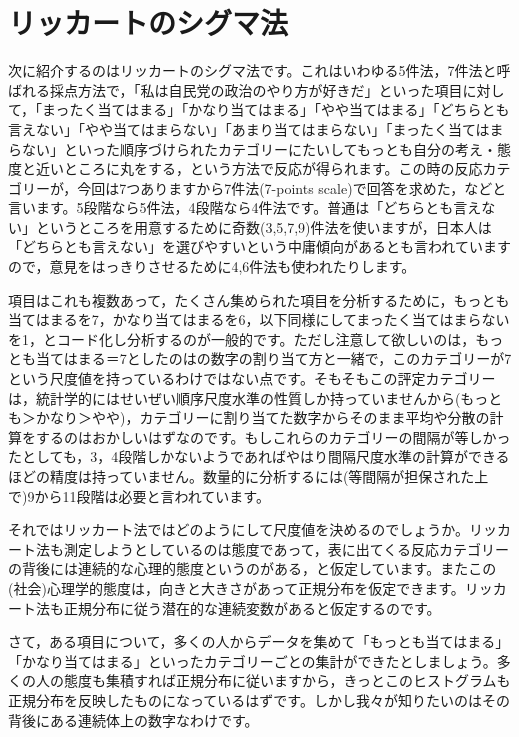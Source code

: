\documentclass{ltjsbook}
\begin{document}
\section{リッカートのシグマ法}
\label{LikertScale}
次に紹介するのはリッカートのシグマ法です。これはいわゆる5件法，7件法と呼ばれる採点方法で，「私は自民党の政治のやり方が好きだ」といった項目に対して，「まったく当てはまる」「かなり当てはまる」「やや当てはまる」「どちらとも言えない」「やや当てはまらない」「あまり当てはまらない」「まったく当てはまらない」といった順序づけられたカテゴリーにたいしてもっとも自分の考え・態度と近いところに丸をする，という方法で反応が得られます。この時の反応カテゴリーが，今回は7つありますから7件法(7-points scale)で回答を求めた，などと言います。5段階なら5件法，4段階なら4件法です。普通は「どちらとも言えない」というところを用意するために奇数(3,5,7,9)件法を使いますが，日本人は「どちらとも言えない」を選びやすいという中庸傾向があるとも言われていますので，意見をはっきりさせるために4,6件法も使われたりします。

項目はこれも複数あって，たくさん集められた項目を分析するために，もっとも当てはまるを7，かなり当てはまるを6，以下同様にしてまったく当てはまらないを1，とコード化し分析するのが一般的です。ただし注意して欲しいのは，もっとも当てはまる＝7としたのはの数字の割り当て方と一緒で，このカテゴリーが7という尺度値を持っているわけではない点です。そもそもこの評定カテゴリーは，統計学的にはせいぜい順序尺度水準の性質しか持っていませんから(もっとも＞かなり＞やや)，カテゴリーに割り当てた数字からそのまま平均や分散の計算をするのはおかしいはずなのです。もしこれらのカテゴリーの間隔が等しかったとしても，3，4段階しかないようであればやはり間隔尺度水準の計算ができるほどの精度は持っていません。数量的に分析するには(等間隔が担保された上で)9から11段階は必要と言われています。

それではリッカート法ではどのようにして尺度値を決めるのでしょうか。リッカート法も測定しようとしているのは態度であって，表に出てくる反応カテゴリーの背後には連続的な心理的態度というのがある，と仮定しています。またこの(社会)心理学的態度は，向きと大きさがあって正規分布を仮定できます。リッカート法も正規分布に従う潜在的な連続変数があると仮定するのです。

さて，ある項目について，多くの人からデータを集めて「もっとも当てはまる」「かなり当てはまる」といったカテゴリーごとの集計ができたとしましょう。多くの人の態度も集積すれば正規分布に従いますから，きっとこのヒストグラムも正規分布を反映したものになっているはずです。しかし我々が知りたいのはその背後にある連続体上の数字なわけです。
\end{document}
